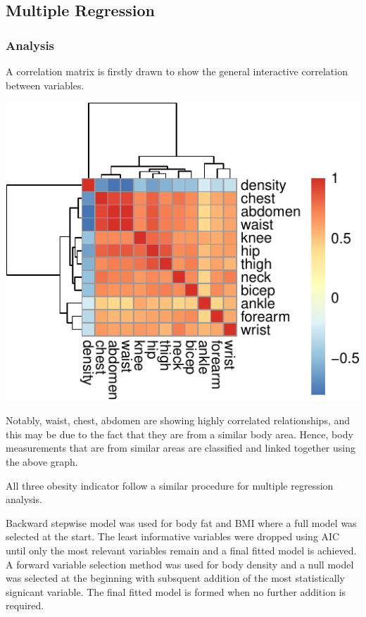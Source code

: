 \documentclass[a4paper,9pt,twocolumn,twoside,]{pinp}
\begin{document}
\hypertarget{multiple-regression}{%
\subsection{Multiple Regression}\label{multiple-regression}}

\hypertarget{analysis-1}{%
\subsubsection{Analysis}\label{analysis-1}}

A correlation matrix is firstly drawn to show the general interactive
correlation between variables.

\begin{center}\includegraphics{Executive_Report_files/figure-latex/unnamed-chunk-1-1} \end{center}

Notably, waist, chest, abdomen are showing highly correlated
relationships, and this may be due to the fact that they are from a
similar body area. Hence, body measurements that are from similar areas
are classified and linked together using the above graph.

All three obesity indicator follow a similar procedure for multiple
regression analysis.

Backward stepwise model was used for body fat and BMI where a full model
was selected at the start. The least informative variables were dropped
using AIC until only the most relevant variables remain and a final
fitted model is achieved. A forward variable selection method was used
for body density and a null model was selected at the beginning with
subsquent addition of the most statistically signicant variable. The
final fitted model is formed when no further addition is required.
\end{document}

